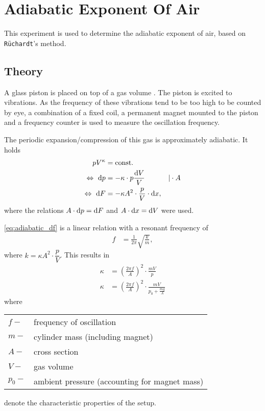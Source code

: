 \chapter{Adiabatic Exponent Of Air}
This experiment is used to determine the adiabatic exponent of air, based on \texttt{Rüchardt}'s method.

\section{Theory}
A glass piston is placed on top of a gas volume .
The piston is excited to vibrations.
As the frequency of these vibrations tend to be too high to be counted by eye, a combination of a fixed coil, a permanent magnet mounted to the piston and a frequency counter is used to measure the oscillation frequency.

The periodic expansion/compression of this gas is approximately adiabatic. It holds
\begin{alignat}{3}
	pV^{\kappa} &= \text{const.} \nonumber \\
	\Leftrightarrow\ \text{d} p &= -\kappa\cdot p\frac{\text{d} V}{V}&|\cdot A \nonumber \\
	\Leftrightarrow\ \text{d} F &= -\kappa A^2\cdot\frac{p}{V}\cdot\text{d} x, \label{eq:adiabatic_df}
\end{alignat}
where the relations $A\cdot \text{d} p=\text{d} F$ and $A\cdot\text{d} x=\text{d} V$ were used.

\autoref{eq:adiabatic_df} is a linear relation with a resonant frequency of
\begin{align*}
	f&=\frac{1}{2\pi}\sqrt{\frac{k}{m}},
\end{align*}
where $k=\kappa A^2\cdot\dfrac{p}{V}$.
This results in
\begin{align}\label{eq:kappa}
	\kappa&=\left(\frac{2\pi f}{A}\right)^2\cdot\frac{mV}{p} \nonumber \\
	\kappa&=\left(\frac{2\pi f}{A}\right)^2\cdot\frac{mV}{p_0+\frac{mg}{A}}
\end{align}
where\par
\begin{tabular}{ll}
	$f-$	&	frequency of oscillation \\
	$m-$	&	cylinder mass (including magnet) \\
	$A-$	&	cross section \\
	$V-$	&	gas volume \\
	$p_0-$	&	ambient pressure (accounting for magnet mass)\\
\end{tabular}\par
denote the characteristic properties of the setup.

